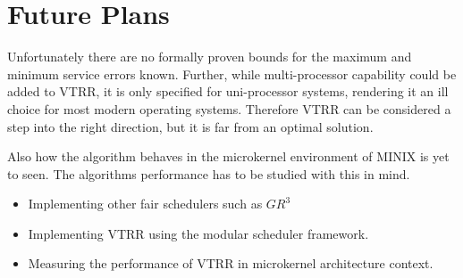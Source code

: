 \chapter{Future Plans}

Unfortunately there are no formally proven bounds for the maximum and minimum service
errors known. Further, while multi-processor capability could be added to VTRR, it is only
specified for uni-processor systems, rendering it an ill choice for most modern operating
systems. Therefore VTRR can be considered a step into the right direction, but it is far
from an optimal solution.

Also how the algorithm behaves in the microkernel environment of MINIX is yet to seen. The
algorithms performance has to be studied with this in mind.

\begin{itemize}
\item Implementing other fair schedulers such as $GR^3$
\item Implementing VTRR using the modular scheduler framework.
\item Measuring the performance of VTRR in microkernel architecture context.
\end{itemize}


